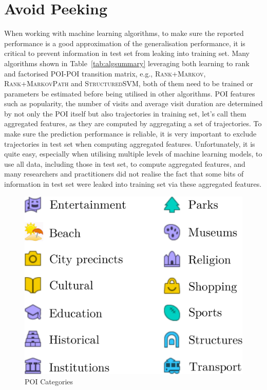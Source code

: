 \section{Avoid Peeking}
When working with machine learning algorithms, to make sure the reported performance is a good approximation
of the generalisation performance, it is critical to prevent information in test set from leaking into
training set.
Many algorithms shown in Table~\ref{tab:algsummary} leveraging both learning to rank and 
factorised POI-POI transition matrix,
e.g., \textsc{Rank+Markov}, \textsc{Rank+MarkovPath} and \textsc{StructuredSVM},
both of them need to be trained or parameters be estimated before being utilised in other algorithms.
POI features such as popularity, the number of visits and average visit duration are
determined by not only the POI itself but also trajectories in training set, 
let's call them aggregated features, as they are computed by aggregating a set of trajectories.
To make sure the prediction performance is reliable, 
it is very important to exclude trajectories in test set when computing aggregated features.
Unfortunately, it is quite easy, especially when utilising multiple levels of machine learning models,
to use all data, including those in test set, to compute aggregated features, 
and many researchers and practitioners did not realise the fact that 
some bits of information in test set were leaked into training set via these aggregated features.



\begin{figure}[t]
	\centering
	\includegraphics[width=0.6\columnwidth]{fig/poi_cats.pdf}
	\caption{POI Categories}
	\label{fig:poicats}
\end{figure}



